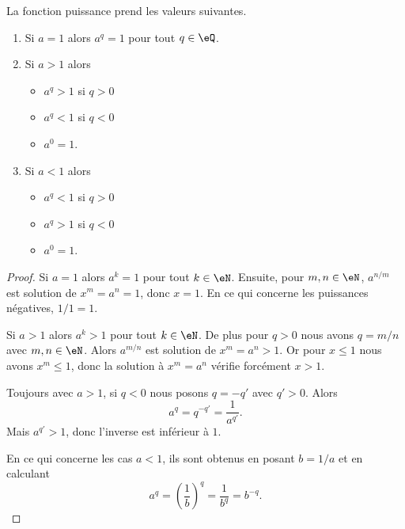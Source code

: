 \begin{lemma}        \label{LEMooXJXUooLoiTMo}
	La fonction puissance prend les valeurs suivantes.
	\begin{enumerate}
		\item
		      Si \( a=1\) alors \( a^q=1\) pour tout \( q\in \eQ\).
		\item       \label{ITEMooKZCGooKskUQx}
		      Si \( a>1\) alors
		      \begin{itemize}
			      \item \( a^q>1\) si \( q>0\)
			      \item \( a^q<1\) si \( q<0\)
			      \item \( a^0=1\).
		      \end{itemize}
		\item
		      Si \( a<1\) alors
		      \begin{itemize}
			      \item \( a^q<1\) si \( q>0\)
			      \item \( a^q>1\) si \( q<0\)
			      \item \( a^0=1\).
		      \end{itemize}
	\end{enumerate}
\end{lemma}

\begin{proof}
	Si \( a=1\) alors \( a^k=1\) pour tout \( k\in \eN\). Ensuite, pour \( m,n\in \eN\), \( a^{n/m}\) est solution de \( x^m=a^n=1\), donc \( x=1\). En ce qui concerne les puissances négatives, \( 1/1=1\).

	Si \( a>1\) alors \( a^k>1\) pour tout \( k\in \eN\). De plus pour \( q>0\) nous avons \( q=m/n\) avec \( m,n\in \eN\). Alors \( a^{m/n}\) est solution de \( x^m=a^n>1\). Or pour \( x\leq 1\) nous avons \( x^m\leq 1\), donc la solution à \( x^m=a^n\) vérifie forcément \( x>1\).

	Toujours avec \( a>1\), si \( q<0\) nous posons \( q=-q'\) avec \( q'>0\). Alors
	\begin{equation}
		a^q=q^{-q'}=\frac{1}{ a^{q'} }.
	\end{equation}
	Mais \( a^{q'}>1\), donc l'inverse est inférieur à \( 1\).

	En ce qui concerne les cas \( a<1\), ils sont obtenus en posant \( b=1/a\) et en calculant
	\begin{equation}
		a^q=\left( \frac{1}{ b } \right)^q=\frac{1}{ b^q }=b^{-q}.
	\end{equation}
\end{proof}

